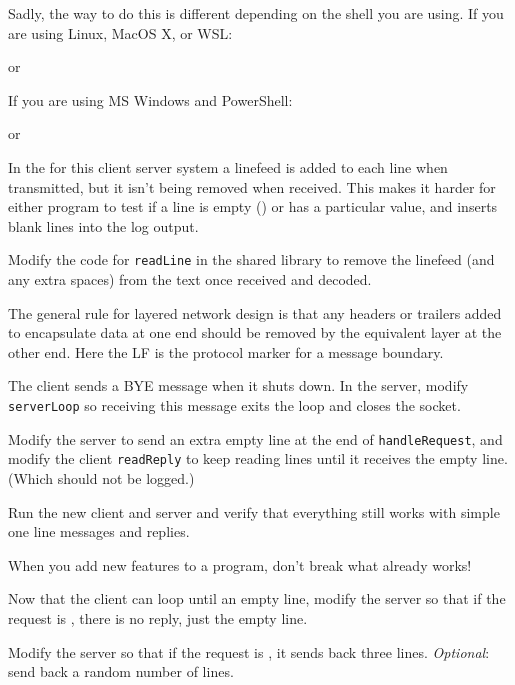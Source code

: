 Sadly, the way to do this is different depending on the shell you are using.
If you are using Linux, MacOS X, or WSL:

or

If you are using MS Windows and PowerShell:

or



\STEP
In the  for this client server system a linefeed is added to
each line when transmitted, but it isn't being removed when received. This
makes it harder for either program to test if a line is  empty (\DQ{}) or
has a particular value, and inserts blank lines into the log output.

Modify the code for \texttt{readLine} in the shared library to remove the
linefeed (and any extra spaces) from the text once received and decoded.

\begin{IMPORTANT}
The general rule for layered network design is that any headers or trailers
added to encapsulate data at one end should be removed by the equivalent
layer at the other end. Here the LF is the protocol marker for a message
boundary.
\end{IMPORTANT}

\STEP
The client sends a BYE message when it shuts down. In the server, modify
\texttt{serverLoop}
so receiving this message exits the loop and closes the socket.

\STEP
Modify the server to send an extra empty line at the end of \texttt{handleRequest},
and modify the client \texttt{readReply} to keep reading lines until it receives
the empty line. (Which should not be logged.)

Run the new client and server and verify that everything still works with
simple one line messages and replies.

\begin{IMPORTANT}
When you add new features to a program, don't break what already works!
\end{IMPORTANT}

\STEP
Now that the client can loop until an empty line, modify the server so
that if the request is , there is no reply, just the empty line.

\STEP
Modify the server so that if the request is , it sends back three
lines. \emph{Optional}: send back a random number of lines.


